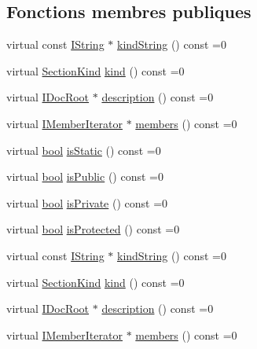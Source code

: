 \subsection*{Fonctions membres publiques}
\begin{DoxyCompactItemize}
\item 
virtual const \hyperlink{class_i_string}{I\+String} $\ast$ \hyperlink{class_i_section_a3be72bf2b7bde49e741bb0d8af4df8e6}{kind\+String} () const  =0
\item 
virtual \hyperlink{class_i_section_af768cbfe7056fadbd0a67d26d0ef84e5}{Section\+Kind} \hyperlink{class_i_section_aea5541b95f6c5b50fd3cad5794b34d47}{kind} () const  =0
\item 
virtual \hyperlink{class_i_doc_root}{I\+Doc\+Root} $\ast$ \hyperlink{class_i_section_a6927694b41def1fdc159e4b21e037ebe}{description} () const  =0
\item 
virtual \hyperlink{class_i_member_iterator}{I\+Member\+Iterator} $\ast$ \hyperlink{class_i_section_a37b0fa3669f435713058ca5c7b377e3a}{members} () const  =0
\item 
virtual \hyperlink{qglobal_8h_a1062901a7428fdd9c7f180f5e01ea056}{bool} \hyperlink{class_i_section_aff6aeaf9972edac9b11fe09d74e58c5d}{is\+Static} () const  =0
\item 
virtual \hyperlink{qglobal_8h_a1062901a7428fdd9c7f180f5e01ea056}{bool} \hyperlink{class_i_section_aac1342e8d3db6be3fb5dada6a06bcdb3}{is\+Public} () const  =0
\item 
virtual \hyperlink{qglobal_8h_a1062901a7428fdd9c7f180f5e01ea056}{bool} \hyperlink{class_i_section_a5a55533e4ac46cd3acf226b80452faaf}{is\+Private} () const  =0
\item 
virtual \hyperlink{qglobal_8h_a1062901a7428fdd9c7f180f5e01ea056}{bool} \hyperlink{class_i_section_ad883e4145d8cf50b8fdcb97266845e8d}{is\+Protected} () const  =0
\item 
virtual const \hyperlink{class_i_string}{I\+String} $\ast$ \hyperlink{class_i_section_a3be72bf2b7bde49e741bb0d8af4df8e6}{kind\+String} () const  =0
\item 
virtual \hyperlink{class_i_section_af768cbfe7056fadbd0a67d26d0ef84e5}{Section\+Kind} \hyperlink{class_i_section_aea5541b95f6c5b50fd3cad5794b34d47}{kind} () const  =0
\item 
virtual \hyperlink{class_i_doc_root}{I\+Doc\+Root} $\ast$ \hyperlink{class_i_section_a6927694b41def1fdc159e4b21e037ebe}{description} () const  =0
\item 
virtual \hyperlink{class_i_member_iterator}{I\+Member\+Iterator} $\ast$ \hyperlink{class_i_section_a37b0fa3669f435713058ca5c7b377e3a}{members} () const  =0

\end{DoxyCompactItemize}
